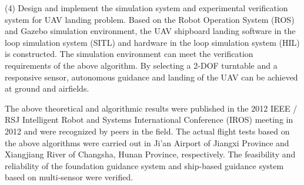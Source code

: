 \begin{eabstract}
(4) Design and implement the simulation system and experimental verification system for UAV landing problem. Based on the Robot Operation System (ROS) and Gazebo simulation environment, the UAV shipboard landing software in the loop simulation system (SITL) and hardware in the loop simulation system (HIL) is constructed. The simulation environment can meet the verification requirements of the above algorithm. By selecting a 2-DOF turntable and a responsive sensor, autonomous guidance and landing of the UAV can be achieved at ground and airfields.

The above theoretical and algorithmic results were published in the 2012 IEEE / RSJ Intelligent Robot and Systems International Conference (IROS) meeting in 2012 and were recognized by peers in the field. The actual flight tests based on the above algorithms were carried out in Ji'an Airport of Jiangxi Province and Xiangjiang River of Changsha, Hunan Province, respectively. The feasibility and reliability of the foundation guidance system and ship-based guidance system based on multi-sensor were verified.
 
 
\end{eabstract}

